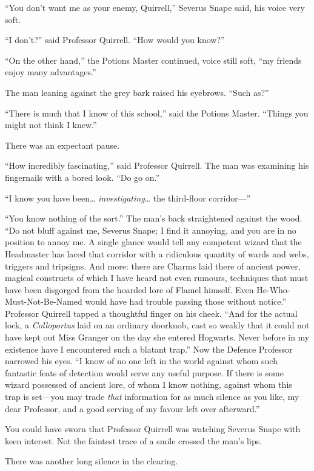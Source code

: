 ``You don't want me as your enemy, Quirrell,'' Severus Snape said, his
voice very soft.

``I don't?'' said Professor Quirrell. ``How would you know?''

``On the other hand,'' the Potions Master continued, voice still soft,
``my friends enjoy many advantages.''

The man leaning against the grey bark raised his eyebrows. ``Such as?''

``There is much that I know of this school,'' said the Potions Master.
``Things you might not think I knew.''

There was an expectant pause.

``How incredibly fascinating,'' said Professor Quirrell. The man was
examining his fingernails with a bored look. ``Do go on.''

``I know you have been\ldots{} \emph{investigating\ldots{}} the
third-floor corridor---''

``You know nothing of the sort.'' The man's back straightened against
the wood. ``Do not bluff against me, Severus Snape; I find it annoying,
and you are in no position to annoy me. A single glance would tell any
competent wizard that the Headmaster has laced that corridor with a
ridiculous quantity of wards and webs, triggers and tripsigns. And more:
there are Charms laid there of ancient power, magical constructs of
which I have heard not even rumours, techniques that must have been
disgorged from the hoarded lore of Flamel himself. Even
He-Who-Must-Not-Be-Named would have had trouble passing those without
notice.'' Professor Quirrell tapped a thoughtful finger on his cheek.
``And for the actual lock, a \emph{Colloportus} laid on an ordinary
doorknob, cast so weakly that it could not have kept out Miss Granger on
the day she entered Hogwarts. Never before in my existence have I
encountered such a blatant trap.'' Now the Defence Professor narrowed
his eyes. ``I know of no one left in the world against whom such
fantastic feats of detection would serve any useful purpose. If there is
some wizard possessed of ancient lore, of whom I know nothing, against
whom this trap is set---you may trade \emph{that} information for as
much silence as you like, my dear Professor, and a good serving of my
favour left over afterward.''

You could have sworn that Professor Quirrell was watching Severus Snape
with keen interest. Not the faintest trace of a smile crossed the man's
lips.

There was another long silence in the clearing.

